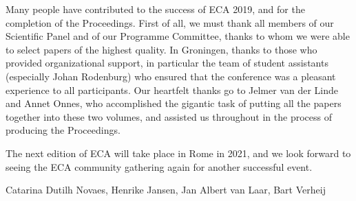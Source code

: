 Many people have contributed to the success of ECA 2019, and for the completion of the Proceedings. First of all, we must thank all members of our Scientific Panel and of our Programme Committee, thanks to whom we were able to select papers of the highest quality. In Groningen, thanks to those who provided organizational support, in particular the team of student assistants (especially Johan Rodenburg) who ensured that the conference was a pleasant experience to all participants. Our heartfelt thanks go to Jelmer van der Linde and Annet Onnes, who accomplished the gigantic task of putting all the papers together into these two volumes, and assisted us throughout in the process of producing the Proceedings.

The next edition of ECA will take place in Rome in 2021, and we look forward to seeing the ECA community gathering again for another successful event.

\medskip

\noindent Catarina Dutilh Novaes, Henrike Jansen, Jan Albert van Laar, Bart Verheij